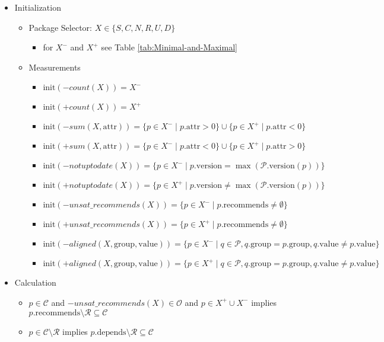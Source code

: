 \documentclass[a4paper,english]{article}
\begin{document}
\begin{itemize}
  \item Initialization
    \begin{itemize}
      \item Package Selector: $X\in\{S,C,N,R,U,D\}$
        \begin{itemize}
          \item for $X^{-}$ and $X^{+}$ see Table \ref{tab:Minimal-and-Maximal}
        \end{itemize}
      \item Measurements
        \begin{itemize}
          \item $\mathrm{init}({-}\mathit{count}(X))=X^{-}$
          \item $\mathrm{init}({+}\mathit{count}(X))=X^{+}$
          \item $\mathrm{init}({-}\mathit{sum}(X,\mathrm{attr}))=\{p\in X^{-}\mid p.\mathrm{attr}>0\}\cup\{p\in X^{+}\mid p.\mathrm{attr}<0\}$
          \item $\mathrm{init}({+}\mathit{sum}(X,\mathrm{attr}))=\{p\in X^{-}\mid p.\mathrm{attr}<0\}\cup\{p\in X^{+}\mid p.\mathrm{attr}>0\}$
          \item $\mathrm{init}({-}\mathit{notuptodate}(X))=\{p\in X^{-}\mid p.\mathrm{version}=\max(\mathcal{P}.\mathrm{version}(p))\}$
          \item $\mathrm{init}({+}\mathit{notuptodate}(X))=\{p\in X^{+}\mid p.\mathrm{version}\not=\max(\mathcal{P}.\mathrm{version}(p))\}$
          \item $\mathrm{init}({-}\mathit{unsat\_recommends}(X))=\{p\in X^{-}\mid p.\mathrm{recommends}\neq\emptyset\}$
          \item $\mathrm{init}({+}\mathit{unsat\_recommends}(X))=\{p\in X^{+}\mid p.\mathrm{recommends}\neq\emptyset\}$
          \item $\mathrm{init}({-}\mathit{aligned}(X,\mathrm{group},\mathrm{value}))=\{p\in X^{-}\mid q\in \mathcal{P}, q.\mathrm{group} = p.\mathrm{group}, q.\mathrm{value} \neq p.\mathrm{value}\}$
          \item $\mathrm{init}({+}\mathit{aligned}(X,\mathrm{group},\mathrm{value}))=\{p\in X^{+}\mid q\in \mathcal{P}, q.\mathrm{group} = p.\mathrm{group}, q.\mathrm{value} \neq p.\mathrm{value}\}$
        \end{itemize}
    \end{itemize}
  \item Calculation
    \begin{itemize}
      \item $p\in \mathcal{C}$ and ${-}\mathit{unsat\_recommends}(X)\in\mathcal{O}$ and $p \in X^{+}\cup X^{-}$ implies $p.\mathrm{recommends}\setminus\mathcal{R}\subseteq\mathcal{C}$
      \item $p\in \mathcal{C}\setminus\mathcal{R}$ implies $p.\mathrm{depends}\setminus\mathcal{R}\subseteq\mathcal{C}$
    \end{itemize}
\end{itemize}
\end{document}
